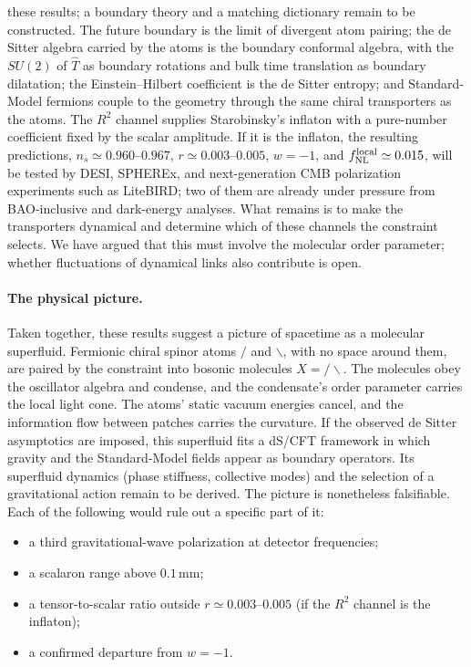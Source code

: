 \documentclass[reprint,aps,prd,amsmath,amssymb,superscriptaddress,nofootinbib,floatfix]{revtex4-2}
\theoremstyle{plain}
\theoremstyle{definition}
\theoremstyle{remark}
\newcommand{\Lat}{\ensuremath{/}}                 %
\newcommand{\Rat}{\ensuremath{\backslash}}        %
\newcommand{\Mol}{\ensuremath{X}}                 %
\newcommand{\Tc}{\hat{T}}
\begin{document}
these results; a boundary theory and a matching dictionary remain to be constructed. The future boundary is the limit of divergent atom pairing; the de Sitter
algebra carried by the atoms is the boundary conformal algebra, with the $SU(2)$ of $\Tc$ as boundary rotations and
bulk time translation as boundary dilatation; the Einstein--Hilbert coefficient is the de Sitter entropy; and
Standard-Model fermions couple to the geometry through the same chiral transporters as the atoms. The $R^2$ channel
supplies Starobinsky's inflaton with a pure-number coefficient fixed by the scalar amplitude. If it is the inflaton, the
resulting predictions, $n_s\simeq0.960$--$0.967$, $r\simeq0.003$--$0.005$, $w=-1$, and $f_{\rm NL}^{\rm local}\simeq0.015$, will be tested by
DESI, SPHEREx, and next-generation CMB polarization experiments such as LiteBIRD; two of them are already under pressure from BAO-inclusive and dark-energy analyses. What
remains is to make the transporters dynamical and determine which of these channels
the constraint selects. We have argued that this must involve the molecular order parameter; whether fluctuations of
dynamical links also contribute is open.

\paragraph*{The physical picture.} Taken together, these results suggest a picture of spacetime as a molecular superfluid.
Fermionic chiral spinor atoms $\Lat$ and $\Rat$, with no space around them, are paired by the constraint into bosonic
molecules $\Mol=\Lat\Rat$. The molecules obey the oscillator algebra and condense, and the condensate's order
parameter carries the local light cone. The atoms' static vacuum energies cancel, and the information flow between patches
carries the curvature. If the observed de Sitter asymptotics are imposed, this superfluid fits a dS/CFT framework in which
gravity and the Standard-Model fields appear as boundary operators. Its superfluid dynamics (phase stiffness, collective
modes) and the selection of a gravitational action remain to be derived. The picture is nonetheless falsifiable. Each of the following would rule out a specific part of it:
\begin{itemize}
\item a third gravitational-wave polarization at detector frequencies;
\item a scalaron range above $0.1$\,mm;
\item a tensor-to-scalar ratio outside $r\simeq0.003$--$0.005$ (if the $R^2$ channel is the inflaton);
\item a confirmed departure from $w=-1$.
\end{itemize}
\end{document}
